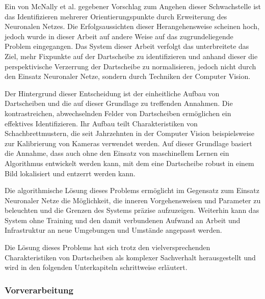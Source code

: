 Ein von McNally et al. gegebener Vorschlag zum Angehen dieser Schwachstelle ist das Identifizieren mehrerer Orientierungspunkte durch Erweiterung des Neuronalen Netzes. Die Erfolgsaussichten dieser Herangehensweise scheinen hoch, jedoch wurde in dieser Arbeit auf andere Weise auf das zugrundeliegende Problem eingegangen. Das System dieser Arbeit verfolgt das unterbreitete das Ziel, mehr Fixpunkte auf der Dartscheibe zu identifizieren und anhand dieser die perspektivische Verzerrung der Dartscheibe zu normalisieren, jedoch nicht durch den Einsatz Neuronaler Netze, sondern durch Techniken der Computer Vision.

Der Hintergrund dieser Entscheidung ist der einheitliche Aufbau von Dartscheiben und die auf dieser Grundlage zu treffenden Annahmen. Die kontrastreichen, abwechselnden Felder von Dartscheiben ermöglichen ein effektives Identifizieren. Ihr Aufbau teilt Charakteristiken von Schachbrettmustern, die seit Jahrzehnten in der Computer Vision beispielsweise zur Kalibrierung von Kameras verwendet werden. Auf dieser Grundlage basiert die Annahme, dass auch ohne den Einsatz von maschinellem Lernen ein Algorithmus entwickelt werden kann, mit dem eine Dartscheibe robust in einem Bild lokalisiert und entzerrt werden kann.

Die algorithmische Lösung dieses Problems ermöglicht im Gegensatz zum Einsatz Neuronaler Netze die Möglichkeit, die inneren Vorgehensweisen und Parameter zu beleuchten und die Grenzen des Systems präzise aufzuzeigen. Weiterhin kann das System ohne Training und den damit verbundenen Aufwand an Arbeit und Infrastruktur an neue Umgebungen und Umstände angepasst werden.

Die Lösung dieses Problems hat sich trotz den vielversprechenden Charakteristiken von Dartscheiben als komplexer Sachverhalt herausgestellt und wird in den folgenden Unterkapiteln schrittweise erläutert.


\subsubsection{Vorverarbeitung}
\label{sec:impl:align:pre}

